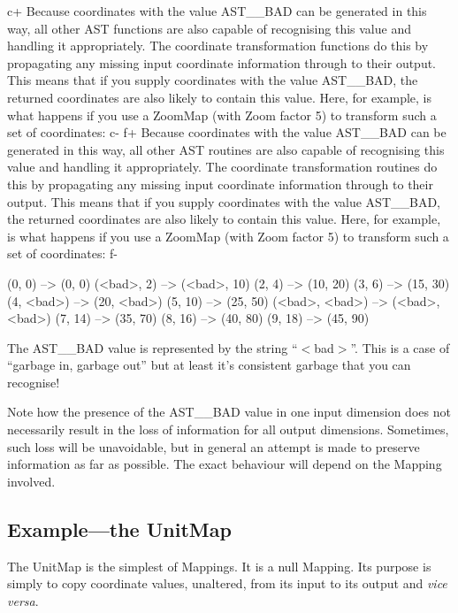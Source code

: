 \documentclass[twoside,11pt]{starlink}
\begin{document}
c+
Because coordinates with the value AST\_\_BAD can be generated in this
way, all other AST functions are also capable of recognising this
value and handling it appropriately. The coordinate transformation
functions do this by propagating any missing input coordinate
information through to their output.  This means that if you supply
coordinates with the value AST\_\_BAD, the returned coordinates are
also likely to contain this value. Here, for example, is what happens
if you use a ZoomMap (with Zoom factor 5) to transform such a set of
coordinates:
c-
f+
Because coordinates with the value AST\_\_BAD can be generated in this
way, all other AST routines are also capable of recognising this value
and handling it appropriately. The coordinate transformation routines
do this by propagating any missing input coordinate information
through to their output.  This means that if you supply coordinates
with the value AST\_\_BAD, the returned coordinates are also likely to
contain this value. Here, for example, is what happens if you use a
ZoomMap (with Zoom factor 5) to transform such a set of coordinates:
f-

\small
\begin{terminalv}
(0, 0) --> (0, 0)
(<bad>, 2) --> (<bad>, 10)
(2, 4) --> (10, 20)
(3, 6) --> (15, 30)
(4, <bad>) --> (20, <bad>)
(5, 10) --> (25, 50)
(<bad>, <bad>) --> (<bad>, <bad>)
(7, 14) --> (35, 70)
(8, 16) --> (40, 80)
(9, 18) --> (45, 90)
\end{terminalv}
\normalsize

The AST\_\_BAD value is represented by the string ``$<$bad$>$''. This
is a case of ``garbage in, garbage out'' but at least it's consistent
garbage that you can recognise!

Note how the presence of the AST\_\_BAD value in one input dimension
does not necessarily result in the loss of information for all output
dimensions. Sometimes, such loss will be unavoidable, but in general
an attempt is made to preserve information as far as possible. The
exact behaviour will depend on the Mapping involved.

\subsection{\label{ss:unitmapexample}Example---the UnitMap}

The UnitMap is the simplest of Mappings. It is a null Mapping. Its
purpose is simply to copy coordinate values, unaltered, from its input
to its output and \emph{vice versa}.
\end{document}

